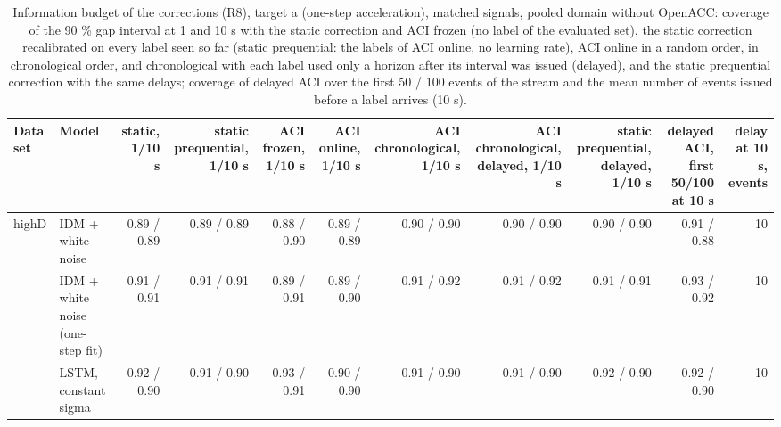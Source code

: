 \begin{table}[htbp]
\centering
\footnotesize
\caption{Information budget of the corrections (R8), target a (one-step acceleration), matched signals, pooled domain without OpenACC: coverage of the 90 \% gap interval at 1 and 10 s with the static correction and ACI frozen (no label of the evaluated set), the static correction recalibrated on every label seen so far (static prequential: the labels of ACI online, no learning rate), ACI online in a random order, in chronological order, and chronological with each label used only a horizon after its interval was issued (delayed), and the static prequential correction with the same delays; coverage of delayed ACI over the first 50 / 100 events of the stream and the mean number of events issued before a label arrives (10 s).}
\label{tab:t4-info-budget--lodo-openacc--a}
\begin{tabular}{llrrrrrrrrr}
\toprule
Data set & Model & static, 1/10 s & static prequential, 1/10 s & ACI frozen, 1/10 s & ACI online, 1/10 s & ACI chronological, 1/10 s & ACI chronological, delayed, 1/10 s & static prequential, delayed, 1/10 s & delayed ACI, first 50/100 at 10 s & delay at 10 s, events \\
\midrule
highD & IDM + white noise & 0.89 / 0.89 & 0.89 / 0.89 & 0.88 / 0.90 & 0.89 / 0.89 & 0.90 / 0.90 & 0.90 / 0.90 & 0.90 / 0.90 & 0.91 / 0.88 & 10 \\
 & IDM + white noise (one-step fit) & 0.91 / 0.91 & 0.91 / 0.91 & 0.89 / 0.91 & 0.89 / 0.90 & 0.91 / 0.92 & 0.91 / 0.92 & 0.91 / 0.91 & 0.93 / 0.92 & 10 \\
 & LSTM, constant sigma & 0.92 / 0.90 & 0.91 / 0.90 & 0.93 / 0.91 & 0.90 / 0.90 & 0.91 / 0.90 & 0.91 / 0.90 & 0.92 / 0.90 & 0.92 / 0.90 & 10 \\

\end{tabular}
\end{table}

